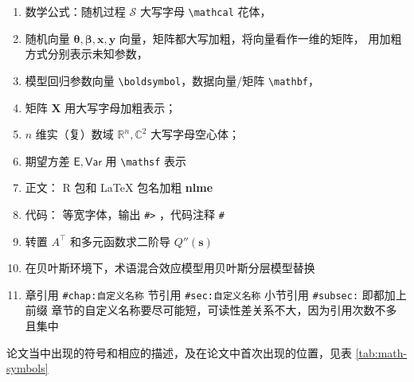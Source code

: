 \documentclass[12pt,a4paper,UTF8,twoside]{book}
\providecommand{\tightlist}{%
  \setlength{\itemsep}{0pt}\setlength{\parskip}{0pt}}
\theoremstyle{definition}
\theoremstyle{definition}
\theoremstyle{definition}
\theoremstyle{remark}
\begin{document}
\begin{enumerate}
\def\labelenumi{\arabic{enumi}.}
\tightlist
\item
  数学公式：随机过程 \(\mathcal{S}\) 大写字母
  \texttt{\textbackslash{}mathcal} 花体，
\item
  随机向量 \(\boldsymbol{\theta,\beta},\mathbf{x,y}\)
  向量，矩阵都大写加粗，将向量看作一维的矩阵，
  用加粗方式分别表示未知参数，
\item
  模型回归参数向量 \texttt{\textbackslash{}boldsymbol}，数据向量/矩阵
  \texttt{\textbackslash{}mathbf}，
\item
  矩阵 \(\mathbf{X}\) 用大写字母加粗表示；
\item
  \(n\) 维实（复）数域 \(\mathbb{R}^n, \mathbb{C}^2\) 大写字母空心体；
\item
  期望方差 \(\mathsf{E,Var}\) 用 \texttt{\textbackslash{}mathsf} 表示
\item
  正文： R 包和 LaTeX 包名加粗 \textbf{nlme}
\item
  代码： 等宽字体，输出 \texttt{\#\textgreater{}} ，代码注释 \texttt{\#}
\item
  转置 \(A^{\top}\) 和多元函数求二阶导 \(Q''(\mathbf{s})\)
\item
  在贝叶斯环境下，术语混合效应模型用贝叶斯分层模型替换
\item
  章引用 \texttt{\#chap:自定义名称} 节引用 \texttt{\#sec:自定义名称}
  小节引用 \texttt{\#subsec:} 即都加上前缀
  章节的自定义名称要尽可能短，可读性差关系不大，因为引用次数不多且集中
\end{enumerate}

论文当中出现的符号和相应的描述，及在论文中首次出现的位置，见表
\ref{tab:math-symbols}
\end{document}
